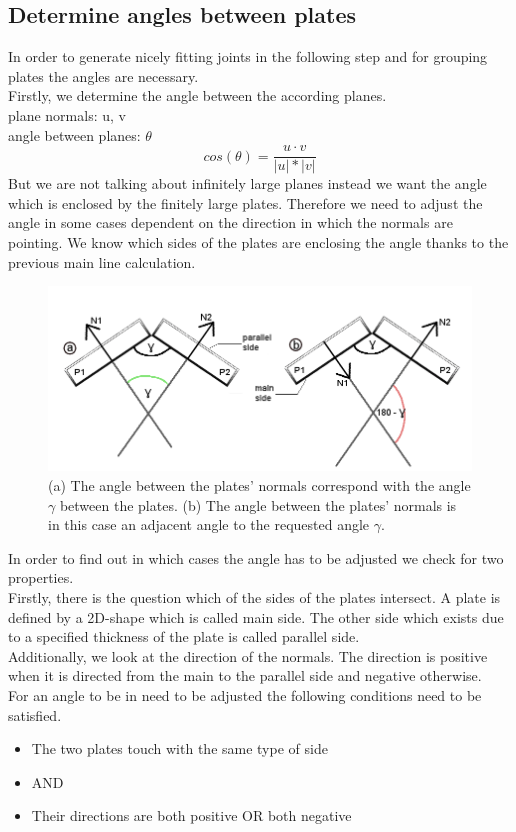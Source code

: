 \documentclass[../ClassicThesis.tex]{subfiles}
\begin{document}
\subsection{Determine angles between plates}
In order to generate nicely fitting joints in the following step and for grouping plates the angles are necessary.\\
Firstly, we determine the angle between the according planes.\\
plane normals: u, v\\
angle between planes: $\theta$
$$ cos(\theta) = \frac{u \cdot v}{|u| * |v|}$$
But we are not talking about infinitely large planes instead we want the angle which is enclosed by the finitely large plates. Therefore we need to adjust the angle in some cases dependent on the direction in which the normals are pointing. We know which sides of the plates are enclosing the angle thanks to the previous main line calculation.
\begin{figure}[h]

\includegraphics[width= 1\columnwidth]{Images/anglesExamplesSmall.png}
\caption{(a) The angle between the plates' normals correspond with the angle $\gamma$ between the plates. (b) The angle between the plates' normals is in this case an adjacent angle to the requested angle $\gamma$.}
\end{figure}

In order to find out in which cases the angle has to be adjusted we check for two properties.\\
Firstly, there is the question which of the sides of the plates intersect. A plate is defined by a 2D-shape which is called main side. The other side which exists due to a specified thickness of the plate is called parallel side.\\
Additionally, we look at the direction of the normals. The direction is positive when it is directed from the main to the parallel side and negative otherwise.\\
For an angle to be in need to be adjusted the following conditions need to be satisfied.
\begin{itemize}
    \item The two plates touch with the same type of side 
    \item[] AND
    \item Their directions are both positive OR both negative
\end{itemize}
\end{document}
